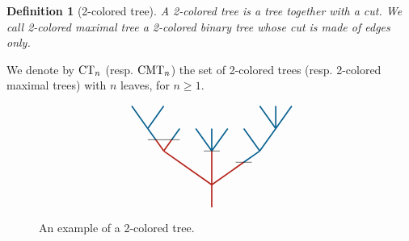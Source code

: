 \documentclass[twoside, 12pt]{amsart}
\newtheorem{definition}{Definition}[section]
\theoremstyle{remark}
\begin{document}
\begin{definition}[2-colored tree] \label{def:2coloredtree}
A \emph{2-colored tree} is a tree together with a cut. We call \emph{2-colored maximal tree} a 2-colored binary tree whose cut is made of edges only. 
\end{definition}
\noindent We denote by $\mathrm{CT}_{n}$ (resp. $\mathrm{CMT}_{n}$) the set of 2-colored trees (resp. 2-colored maximal trees) with $n$ leaves, for $n\geq 1$. 

\begin{figure}[h]
\[\vcenter{\hbox{
\begin{tikzpicture}[yscale=0.7,xscale=1]
\draw[very thick, MidnightBlue] (-2.5,3.5)--(-2,2.5);
\draw[very thick, MidnightBlue] (-1.5,3.5)--(-2,2.5);
\draw[very thick, MidnightBlue] (-2,2.5) -- (-1.75,2);
\draw[very thick, MidnightBlue] (-1.25, 2) -- (-1,2.5);
\draw[very thick, MidnightBlue] (-0.5,2.5) -- (0,1.5);
\draw[very thick, MidnightBlue] (0,1.5)--(0,2.5);
\draw[very thick, MidnightBlue] (0,1.5)--(0.5,2.5);
\draw[very thick, MidnightBlue] (1,1)--(1.5,1.5);
\draw[very thick, MidnightBlue] (1.5,1.5)--(1,2.5);
\draw[very thick, MidnightBlue] (1.5,1.5)--(2,2.5);
\draw[very thick, MidnightBlue] (2,2.5)--(1.5,3.5);
\draw[very thick, MidnightBlue] (2,2.5)--(2,3.5);
\draw[very thick, MidnightBlue] (2,2.5)--(2.5,3.5);
\draw[very thick, BrickRed] (0,-1)--(0, 1.5); 
\draw[very thick, BrickRed] (0,0)--(-1.5,1.5);
\draw[very thick, BrickRed] (-1.5,1.5)--(-1.75, 2); 
\draw[very thick, BrickRed] (-1.5,1.5)--(-1.25, 2); 
\draw[very thick, BrickRed] (0,0)--(1, 1);
\draw (-2,2) to (-1,2); 
\draw (-0.25,1.5)-- (0.25, 1.5) ; 
\draw (0.75,1) to (1.25,1);
\end{tikzpicture}}}\]
\caption{An example of a 2-colored tree.}
\label{Fig1:2ColTree}
\end{figure}
\end{document}
